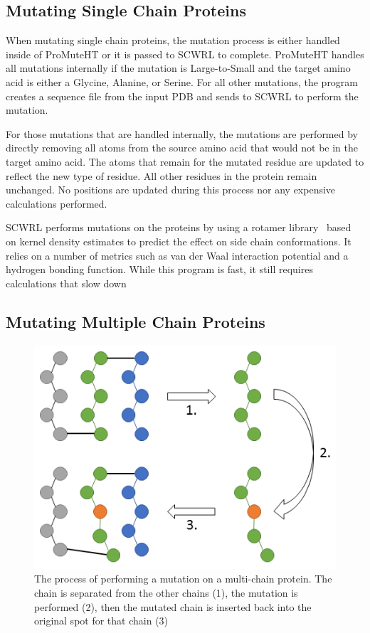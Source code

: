 \documentclass[sigconf]{acmart}
\begin{document}
\subsection{Mutating Single Chain Proteins}
When mutating single chain proteins, the mutation process is either handled inside of ProMuteHT or it is passed to SCWRL to complete. ProMuteHT handles all mutations internally if the mutation is Large-to-Small and the target amino acid is either a Glycine, Alanine, or Serine.  For all other mutations, the program creates a sequence file from the input PDB and sends to SCWRL to perform the mutation.

For those mutations that are handled internally, the mutations are performed by directly removing all atoms from the source amino acid that would not be in the target amino acid. The atoms that remain for the mutated residue are updated to reflect the new type of residue.  All other residues in the protein remain unchanged.  No positions are updated during this process nor any expensive calculations performed.

SCWRL performs mutations on the proteins by using a rotamer library~\cite{bower1997} based on kernel density estimates to predict the effect on side chain conformations.  It relies on a number of metrics such as van der Waal interaction potential and a hydrogen bonding function.  While this program is fast, it still requires calculations that slow down 

\subsection{Mutating Multiple Chain Proteins}
\begin{figure}[h]
\includegraphics[width=0.85\columnwidth]{Figures/MultiChain.png}
\caption{The process of performing a mutation on a multi-chain protein. The chain is separated from the other chains (1), the mutation is performed (2), then the mutated chain is inserted back into the original spot for that chain (3)}
\label{multi}
\end{figure}
\end{document}
